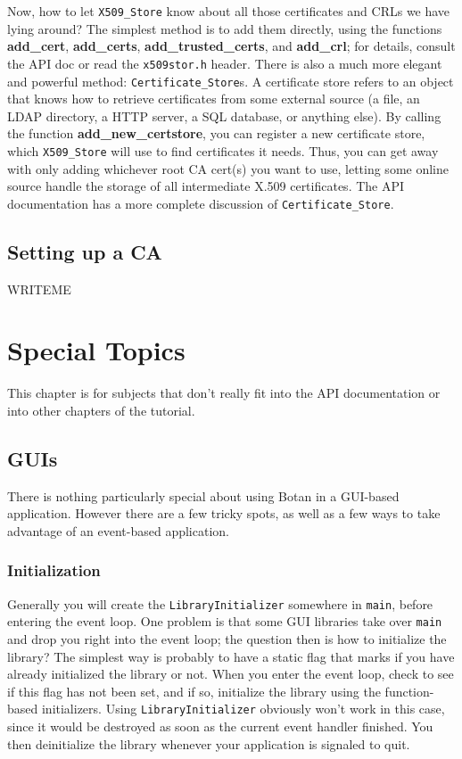 \documentclass{article}
\newcommand{\filename}[1]{\texttt{#1}}
\newcommand{\function}[1]{\textbf{#1}}
\newcommand{\type}[1]{\texttt{#1}}
\begin{document}
Now, how to let \type{X509\_Store} know about all those certificates and CRLs
we have lying around? The simplest method is to add them directly, using the
functions \function{add\_cert}, \function{add\_certs},
\function{add\_trusted\_certs}, and \function{add\_crl}; for details, consult
the API doc or read the \filename{x509stor.h} header. There is also a much more
elegant and powerful method: \type{Certificate\_Store}s. A certificate store
refers to an object that knows how to retrieve certificates from some external
source (a file, an LDAP directory, a HTTP server, a SQL database, or anything
else). By calling the function \function{add\_new\_certstore}, you can register
a new certificate store, which \type{X509\_Store} will use to find certificates
it needs. Thus, you can get away with only adding whichever root CA cert(s) you
want to use, letting some online source handle the storage of all intermediate
X.509 certificates. The API documentation has a more complete discussion of
\type{Certificate\_Store}.

\subsection{Setting up a CA}

WRITEME

\pagebreak

\section{Special Topics}

This chapter is for subjects that don't really fit into the API documentation
or into other chapters of the tutorial.

\subsection{GUIs}

There is nothing particularly special about using Botan in a GUI-based
application. However there are a few tricky spots, as well as a few ways to
take advantage of an event-based application.

\subsubsection{Initialization}

Generally you will create the \type{LibraryInitializer} somewhere in
\texttt{main}, before entering the event loop. One problem is that some GUI
libraries take over \texttt{main} and drop you right into the event loop; the
question then is how to initialize the library? The simplest way is probably to
have a static flag that marks if you have already initialized the library or
not. When you enter the event loop, check to see if this flag has not been set,
and if so, initialize the library using the function-based initializers. Using
\type{LibraryInitializer} obviously won't work in this case, since it would be
destroyed as soon as the current event handler finished. You then deinitialize
the library whenever your application is signaled to quit.
\end{document}
